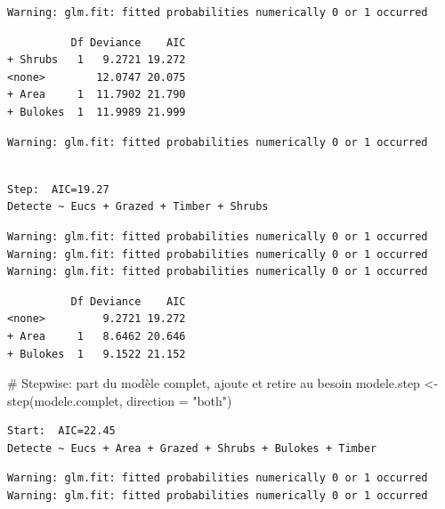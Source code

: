 \documentclass[
  french,
  letterpaper,
  DIV=11,
  numbers=noendperiod]{scrreprt}
\newenvironment{Shaded}{\begin{snugshade}}{\end{snugshade}}
\newcommand{\AttributeTok}[1]{\textcolor[rgb]{0.40,0.45,0.13}{#1}}
\newcommand{\CommentTok}[1]{\textcolor[rgb]{0.37,0.37,0.37}{#1}}
\newcommand{\FunctionTok}[1]{\textcolor[rgb]{0.28,0.35,0.67}{#1}}
\newcommand{\NormalTok}[1]{\textcolor[rgb]{0.00,0.23,0.31}{#1}}
\newcommand{\OtherTok}[1]{\textcolor[rgb]{0.00,0.23,0.31}{#1}}
\newcommand{\StringTok}[1]{\textcolor[rgb]{0.13,0.47,0.30}{#1}}
\newcounter{none} %
\begin{document}
\begin{verbatim}
Warning: glm.fit: fitted probabilities numerically 0 or 1 occurred
\end{verbatim}

\begin{verbatim}
          Df Deviance    AIC
+ Shrubs   1   9.2721 19.272
<none>        12.0747 20.075
+ Area     1  11.7902 21.790
+ Bulokes  1  11.9989 21.999
\end{verbatim}

\begin{verbatim}
Warning: glm.fit: fitted probabilities numerically 0 or 1 occurred
\end{verbatim}

\begin{verbatim}

Step:  AIC=19.27
Detecte ~ Eucs + Grazed + Timber + Shrubs
\end{verbatim}

\begin{verbatim}
Warning: glm.fit: fitted probabilities numerically 0 or 1 occurred
Warning: glm.fit: fitted probabilities numerically 0 or 1 occurred
Warning: glm.fit: fitted probabilities numerically 0 or 1 occurred
\end{verbatim}

\begin{verbatim}
          Df Deviance    AIC
<none>         9.2721 19.272
+ Area     1   8.6462 20.646
+ Bulokes  1   9.1522 21.152
\end{verbatim}

\begin{Shaded}
\begin{Highlighting}[]
\CommentTok{\# Stepwise: part du modèle complet, ajoute et retire au besoin}
\NormalTok{modele.step }\OtherTok{\textless{}{-}} \FunctionTok{step}\NormalTok{(modele.complet, }\AttributeTok{direction =} \StringTok{"both"}\NormalTok{)}
\end{Highlighting}
\end{Shaded}

\begin{verbatim}
Start:  AIC=22.45
Detecte ~ Eucs + Area + Grazed + Shrubs + Bulokes + Timber
\end{verbatim}

\begin{verbatim}
Warning: glm.fit: fitted probabilities numerically 0 or 1 occurred
Warning: glm.fit: fitted probabilities numerically 0 or 1 occurred
\end{verbatim}
\end{document}
